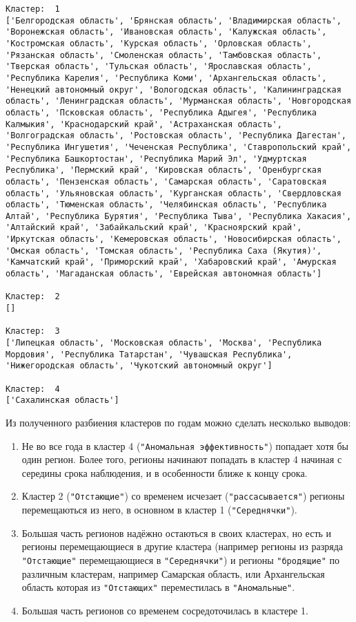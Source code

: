 \documentclass[11pt]{article}
\begin{document}
\begin{Verbatim}[commandchars=\\\{\}]
Кластер:  1
['Белгородская область', 'Брянская область', 'Владимирская область', 'Воронежская область', 'Ивановская область', 'Калужская область', 'Костромская область', 'Курская область', 'Орловская область', 'Рязанская область', 'Смоленская область', 'Тамбовская область', 'Тверская область', 'Тульская область', 'Ярославская область', 'Республика Карелия', 'Республика Коми', 'Архангельская область', 'Ненецкий автономный округ', 'Вологодская область', 'Калинингpадская область', 'Ленинградская область', 'Мурманская область', 'Новгородская область', 'Псковская область', 'Республика Адыгея', 'Республика Калмыкия', 'Краснодарский край', 'Астраханская область', 'Волгоградская область', 'Ростовская область', 'Республика Дагестан', 'Республика Ингушетия', 'Чеченская Республика', 'Ставропольский край', 'Республика Башкортостан', 'Республика Марий Эл', 'Удмуртская Республика', 'Пермский край', 'Кировская область', 'Оренбургская область', 'Пензенская область', 'Самарская область', 'Саратовская область', 'Ульяновская область', 'Курганская область', 'Свердловская область', 'Тюменская область', 'Челябинская область', 'Республика Алтай', 'Республика Бурятия', 'Республика Тыва', 'Республика Хакасия', 'Алтайский край', 'Забайкальский край', 'Красноярский край', 'Иркутская область', 'Кемеровская область', 'Новосибирская область', 'Омская область', 'Томская область', 'Республика Саха (Якутия)', 'Камчатский край', 'Приморский край', 'Хабаровский край', 'Амурская область', 'Магаданская область', 'Еврейская автономная область']

Кластер:  2
[]

Кластер:  3
['Липецкая область', 'Московская область', 'Москва', 'Республика Мордовия', 'Республика Татарстан', 'Чувашская Республика', 'Нижегородская область', 'Чукотский автономный округ']

Кластер:  4
['Сахалинская область']

    \end{Verbatim}

    Из полученного разбиения кластеров по годам можно сделать несколько
выводов:

\begin{enumerate}
\item Не во все года в кластер 4 (\verb'"Аномальная эффективность"') попадает хотя бы один регион. Более того, регионы начинают попадать в кластер 4 начиная с середины срока наблюдения, и в особенности ближе к концу срока.
\item Кластер 2 (\verb'"Отстающие"') со временем исчезает (\verb'"рассасывается"') регионы перемещаються из него, в основном в кластер 1 (\verb'"Середнячки"').
\item Большая часть регионов надёжно остаються в своих кластерах, но есть и регионы перемещающиеся в другие кластера (например регионы из разряда \verb'"Отстающие"' перемещающиеся в \verb'"Середнячки"') и регионы \verb'"бродящие"' по различным кластерам, например Самарская область, или Архангельская область которая из \verb'"Отстающих"' переместилась в \verb'"Аномальные"'.
\item Большая часть регионов со временем сосредоточилась в кластере 1.
\end{enumerate}
\end{document}
